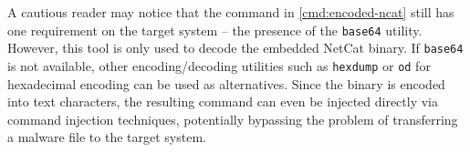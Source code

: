 A cautious reader may notice that the command in \cref{cmd:encoded-ncat} still has one requirement on the target system -- the presence of the \texttt{base64} utility. However, this tool is only used to decode the embedded NetCat binary. If \texttt{base64} is not available, other encoding/decoding utilities such as \texttt{hexdump} or \texttt{od} for hexadecimal encoding can be used as alternatives. Since the binary is encoded into text characters, the resulting command can even be injected directly via command injection techniques, potentially bypassing the problem of transferring a malware file to the target system.
